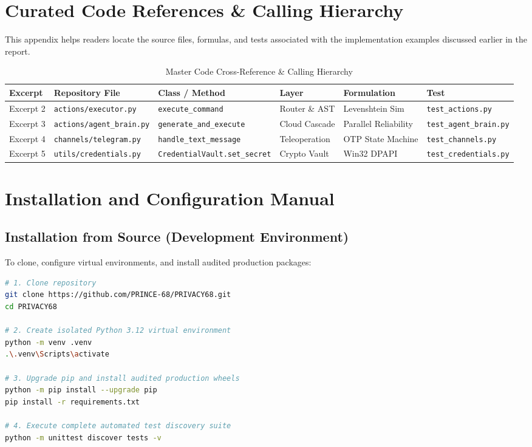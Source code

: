 \documentclass[12pt,letterpaper,oneside]{report}
\begin{document}
\chapter{Curated Code References \& Calling Hierarchy}
This appendix helps readers locate the source files, formulas, and tests associated with the implementation examples discussed earlier in the report.

\begin{table}[H]
\centering
\caption{Master Code Cross-Reference \& Calling Hierarchy}
\label{tab:code_hierarchy}
\begin{tabularx}{\textwidth}{|l|l|l|l|X|l|}
\hline
\textbf{Excerpt} & \textbf{Repository File} & \textbf{Class / Method} & \textbf{Layer} & \textbf{Formulation} & \textbf{Test}\\ \hline
Excerpt 2 & \texttt{actions/executor.py} & \texttt{execute\_command} & Router \& AST & Levenshtein Sim & \texttt{test\_actions.py}\\ \hline
Excerpt 3 & \texttt{actions/agent\_brain.py} & \texttt{generate\_and\_execute} & Cloud Cascade & Parallel Reliability & \texttt{test\_agent\_brain.py}\\ \hline
Excerpt 4 & \texttt{channels/telegram.py} & \texttt{handle\_text\_message} & Teleoperation & OTP State Machine & \texttt{test\_channels.py}\\ \hline
Excerpt 5 & \texttt{utils/credentials.py} & \texttt{CredentialVault.set\_secret} & Crypto Vault & Win32 DPAPI & \texttt{test\_credentials.py}\\ \hline
\end{tabularx}
\end{table}

\chapter{Installation and Configuration Manual}
\section{Installation from Source (Development Environment)}
To clone, configure virtual environments, and install audited production packages:

\begin{lstlisting}[language=bash,caption={Source Installation and Verification Commands}]
# 1. Clone repository
git clone https://github.com/PRINCE-68/PRIVACY68.git
cd PRIVACY68

# 2. Create isolated Python 3.12 virtual environment
python -m venv .venv
.\.venv\Scripts\activate

# 3. Upgrade pip and install audited production wheels
python -m pip install --upgrade pip
pip install -r requirements.txt

# 4. Execute complete automated test discovery suite
python -m unittest discover tests -v
\end{lstlisting}
\end{document}

